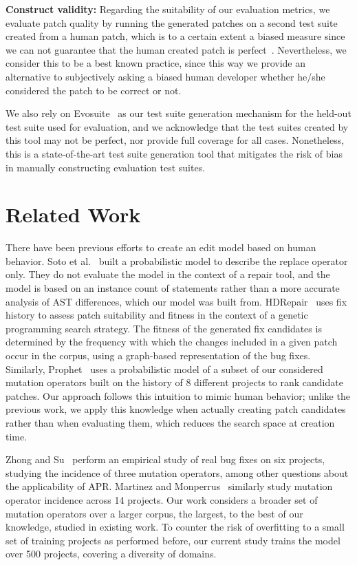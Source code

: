 \documentclass[sigconf]{acmart}
\begin{document}
\noindent\textbf{Construct validity:}
Regarding the suitability of our evaluation metrics, we evaluate patch
quality by running the generated patches on a second test suite created
from a human patch, which is to a certain extent a biased measure since we can
not guarantee that the human created patch is perfect~\cite{smith15}. Nevertheless, we consider 
this to be a
best known practice, since this way we provide an alternative to subjectively 
asking a biased human developer
whether he/she considered the patch to be correct or not. 

We also rely on Evosuite~\cite{Fraser11Evosuite} as our test suite generation
mechanism for the held-out test suite used for evaluation, and we acknowledge
that the test suites created by this tool may not be perfect, nor provide full
coverage for all cases.  Nonetheless, this is a state-of-the-art test suite
generation tool that mitigates the risk of bias in manually constructing
evaluation test suites.

\section{Related Work} \label{relatedWork}

There have been previous efforts to create an edit model based on human behavior.  
Soto et al.~\cite{Soto16} 
built a probabilistic model to describe the replace 
operator only. They do not evaluate the model in the context of a repair
tool, and the model is based on an instance count of statements rather than a more 
accurate analysis of AST differences, which our model was built from.  
HDRepair~\cite{xuan16} 
uses fix history
to assess patch suitability and fitness in the context of a genetic
programming search strategy. The fitness of the generated
fix candidates is determined by the frequency with which the changes included in
a given patch occur in the corpus, using a graph-based representation of the bug
fixes.  Similarly, Prophet~\cite{long16proph} uses a
probabilistic model of a subset of our considered mutation operators built on 
the history of 8 different projects to rank candidate
patches.  Our approach follows this intuition to mimic human
behavior; unlike the previous work, we apply this knowledge when actually
creating patch candidates rather than when evaluating them, which reduces the 
search space at creation time.  

Zhong and Su~\cite{zhong15} perform an empirical study of
real bug fixes on six projects, studying the incidence of three mutation
operators, among other questions about the applicability of APR.  Martinez and
Monperrus~\cite{martinez15} similarly study mutation operator incidence across 
14 
projects. Our work considers a broader set of
mutation operators over a larger corpus, the largest, to the best of our
knowledge, studied in existing work. To counter the 
risk of overfitting to a small set of training projects as performed before, our 
current study trains the model over 500 projects, covering a diversity 
of domains.
\end{document}
